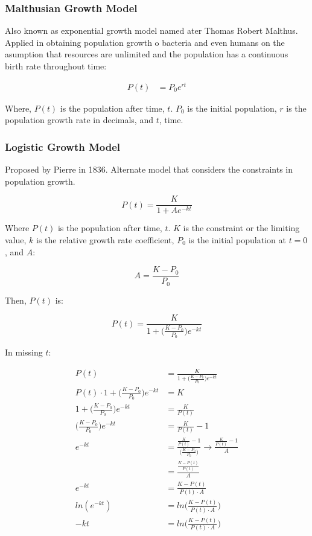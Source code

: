 \documentclass[12pt, UTF8]{article}
\begin{document}
	\subsubsection*{Malthusian Growth Model}
	
	Also known as exponential growth model named ater Thomas Robert Malthus. Applied in obtaining population growth o bacteria and even humans on the asumption that resources are unlimited and the population has a continuous birth rate throughout time:
	
	\begin{align}
		P(t) &= P_{0} e^{rt} 
	\end{align}
	
	Where, $P(t)$ is the population after time, $t$. $P_{0}$ is the initial population, $r$ is the population growth rate in decimals, and $t$, time.
	
	\subsubsection*{Logistic Growth Model}
	
	Proposed by Pierre in 1836. Alternate model that considers the constraints in population growth.
	
	\begin{equation}
		P(t) = \frac{K}{1 + Ae^{-kt}}
	\end{equation}
	
	Where $P(t)$ is the population after time, $t$. $K$ is the constraint or the limiting value, $k$ is the relative growth rate coefficient, $P_{0}$ is the initial population at $t = 0$, and $A$:
	
	\begin{equation}
		A = \frac{K - P_{0}}{P_{0}}
	\end{equation}
	
	Then, $P(t)$ is:
	
	\begin{equation}
		P(t) = \frac{K}{1 + \bigg(\frac{K - P_{0}}{P_{0}}\bigg)e^{-kt}}
	\end{equation}
	
	In missing $t$:
	
	\begin{align}
		P(t) &= \frac{K}{1 + \bigg(\frac{K - P_{0}}{P_{0}}\bigg)e^{-kt}}  \nonumber \\
		P(t) \cdot 1 + \bigg(\frac{K - P_{0}}{P_{0}}\bigg)e^{-kt} &= K  \nonumber \\
		1 + \bigg(\frac{K - P_{0}}{P_{0}}\bigg)e^{-kt} &= \frac{K}{P(t)}  \nonumber \\
		\bigg(\frac{K - P_{0}}{P_{0}}\bigg)e^{-kt} &= \frac{K}{P(t)} - 1  \nonumber \\
		e^{-kt} &= \frac{\frac{K}{P(t)} - 1}{\bigg(\frac{K - P_{0}}{P_{0}}\bigg)} \longrightarrow \frac{\frac{K}{P(t)} - 1}{A} \\
		&= \frac{\frac{K - P(t)}{P(t)}}{A}  \nonumber \\
		e^{-kt} &= \frac{K - P(t)}{P(t) \cdot A}  \nonumber \\
		ln(e^{-kt}) &= ln\bigg(\frac{K - P(t)}{P(t) \cdot A}\bigg)  \nonumber \\
		-kt &= ln\bigg(\frac{K - P(t)}{P(t) \cdot A}\bigg) 
	\end{align}
	
\end{document}
